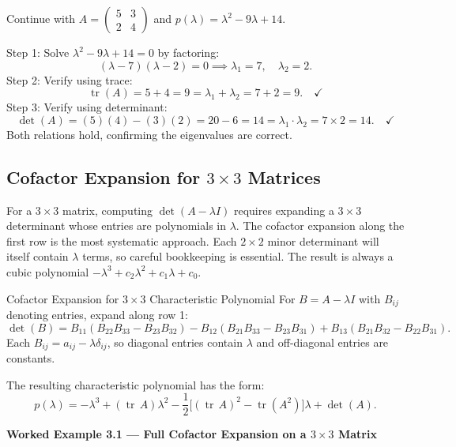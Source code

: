 \documentclass[12pt,a4paper]{article}
\begin{document}
Continue with $A = \begin{pmatrix} 5 & 3 \\ 2 & 4 \end{pmatrix}$ and $p(\lambda) = \lambda^2 - 9\lambda + 14$.

Step 1: Solve $\lambda^2 - 9\lambda + 14 = 0$ by factoring:
\[
  (\lambda - 7)(\lambda - 2) = 0 \implies \lambda_1 = 7,\quad \lambda_2 = 2.
\]
Step 2: Verify using trace:
\[
  \operatorname{tr}(A) = 5 + 4 = 9 = \lambda_1 + \lambda_2 = 7 + 2 = 9. \quad \checkmark
\]
Step 3: Verify using determinant:
\[
  \det(A) = (5)(4) - (3)(2) = 20 - 6 = 14 = \lambda_1 \cdot \lambda_2 = 7 \times 2 = 14. \quad \checkmark
\]
Both relations hold, confirming the eigenvalues are correct.

\subsection{Cofactor Expansion for \texorpdfstring{$3\times3$}{3x3} Matrices}

For a $3\times 3$ matrix, computing $\det(A-\lambda I)$ requires expanding a $3\times 3$
determinant whose entries are polynomials in $\lambda$. The cofactor expansion along the
first row is the most systematic approach. Each $2\times 2$ minor determinant will itself
contain $\lambda$ terms, so careful bookkeeping is essential. The result is always a cubic
polynomial $-\lambda^3 + c_2\lambda^2 + c_1\lambda + c_0$.

\begin{infobox}{Cofactor Expansion for $3\times3$ Characteristic Polynomial}
For $B = A - \lambda I$ with $B_{ij}$ denoting entries, expand along row 1:
\[
  \det(B) = B_{11}(B_{22}B_{33}-B_{23}B_{32})
           - B_{12}(B_{21}B_{33}-B_{23}B_{31})
           + B_{13}(B_{21}B_{32}-B_{22}B_{31}).
\]
Each $B_{ij} = a_{ij} - \lambda\delta_{ij}$, so diagonal entries contain $\lambda$ and
off-diagonal entries are constants.

The resulting characteristic polynomial has the form:
\[
  p(\lambda) = -\lambda^3 + (\operatorname{tr}\,A)\lambda^2 - \frac{1}{2}\bigl[(\operatorname{tr}\,A)^2 - \operatorname{tr}(A^2)\bigr]\lambda + \det(A).
\]
\end{infobox}

\textbf{Worked Example 3.1 --- Full Cofactor Expansion on a $3\times3$ Matrix}
\end{document}
